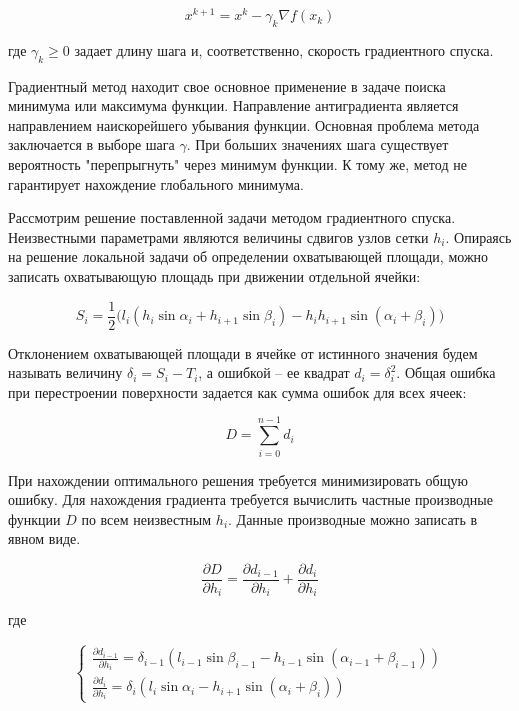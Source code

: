 \documentclass[
11pt,%
tightenlines,%
twoside,%
onecolumn,%
nofloats,%
nobibnotes,%
nofootinbib,%
superscriptaddress,%
noshowpacs,%
centertags]%
{revtex4}
\begin{document}
\begin{equation}
x^{k+1} = x^k - \gamma _k \nabla f(x_k)
\end{equation}

где $\gamma _k \geq 0$ задает длину шага и, соответственно, скорость градиентного спуска.

Градиентный метод находит свое основное применение в задаче поиска минимума или максимума функции.
Направление антиградиента является направлением наискорейшего убывания функции.
Основная проблема метода заключается в выборе шага $\gamma$.
При больших значениях шага существует вероятность "перепрыгнуть" через минимум функции.
К тому же, метод не гарантирует нахождение глобального минимума.

Рассмотрим решение поставленной задачи методом градиентного спуска.
Неизвестными параметрами являются величины сдвигов узлов сетки $h_i$.
Опираясь на решение локальной задачи об определении охватывающей площади, можно записать охватывающую площадь при движении отдельной ячейки:

\begin{equation}
S_i = \frac{1}{2}\big(l_i(h_i \sin \alpha_i + h_{i + 1} \sin \beta_i) - h_ih_{i + 1} \sin(\alpha_i + \beta_i)\big) 
\end{equation}

Отклонением охватывающей площади в ячейке от истинного значения будем называть величину $\delta_i = S_i - T_i$, а ошибкой -- ее квадрат $d_i = \delta_i^2$.
Общая ошибка при перестроении поверхности задается как сумма ошибок для всех ячеек:

\begin{equation}
D = \sum_{i = 0}^{n - 1}{d_i}
\end{equation}

При нахождении оптимального решения требуется минимизировать общую ошибку.
Для нахождения градиента требуется вычислить частные производные функции $D$ по всем неизвестным $h_i$.
Данные производные можно записать в явном виде.

\begin{equation}
\frac{\partial D}{\partial h_i} = \frac{\partial d_{i - 1}}{\partial h_i} + \frac{\partial d_i}{\partial h_i}
\end{equation}

где

\begin{equation}
\begin{cases}
\frac{\partial d_{i - 1}}{\partial h_i} = \delta_{i - 1}(l_{i - 1} \sin \beta_{i - 1} - h_{i - 1} \sin(\alpha_{i - 1} + \beta_{i - 1})) \\
\frac{\partial d_i}{\partial h_i} = \delta_i(l_i \sin \alpha_i - h_{i + 1} \sin(\alpha_i + \beta_i))
\end{cases}
\end{equation}
\end{document}
